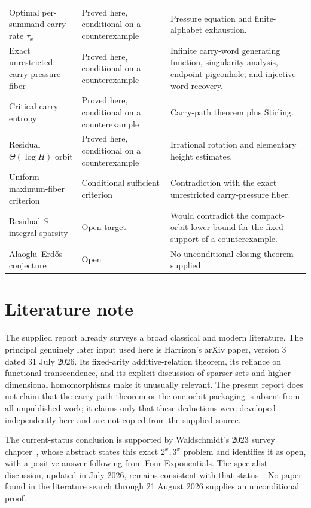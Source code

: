 \documentclass[11pt,oneside]{article}
\theoremstyle{definition}
\begin{document}
\begin{longtable}{@{}>{\raggedright\arraybackslash}p{}>{\raggedright\arraybackslash}p{}>{\raggedright\arraybackslash}p{}@{}}
Optimal per-summand carry rate $\tau_x$ & Proved here, conditional on a counterexample & Pressure equation and finite-alphabet exhaustion. \\
Exact unrestricted carry-pressure fiber & Proved here, conditional on a counterexample & Infinite carry-word generating function, singularity analysis, endpoint pigeonhole, and injective word recovery. \\
Critical carry entropy & Proved here, conditional on a counterexample & Carry-path theorem plus Stirling. \\
Residual $\Theta(\log H)$ orbit & Proved here, conditional on a counterexample & Irrational rotation and elementary height estimates. \\
Uniform maximum-fiber criterion & Conditional sufficient criterion & Contradiction with the exact unrestricted carry-pressure fiber. \\
Residual $S$-integral sparsity & Open target & Would contradict the compact-orbit lower bound for the fixed support of a counterexample. \\
Alaoglu--Erd\H{o}s conjecture & Open & No unconditional closing theorem supplied. \\
\bottomrule
\end{longtable}

\section{Literature note}

The supplied report already surveys a broad classical and modern literature.  The principal genuinely later input used here is Harrison's arXiv paper, version 3 dated 31 July 2026.  Its fixed-arity additive-relation theorem, its reliance on functional transcendence, and its explicit discussion of sparser sets and higher-dimensional homomorphisms make it unusually relevant.  The present report does not claim that the carry-path theorem or the one-orbit packaging is absent from all unpublished work; it claims only that these deductions were developed independently here and are not copied from the supplied source.

The current-status conclusion is supported by Waldschmidt's 2023 survey chapter~\cite{Waldschmidt2023}, whose abstract states this exact $2^x,3^x$ problem and identifies it as open, with a positive answer following from Four Exponentials.  The specialist discussion, updated in July 2026, remains consistent with that status~\cite{MathOverflow2026}.  No paper found in the literature search through 21 August 2026 supplies an unconditional proof.
\end{document}
